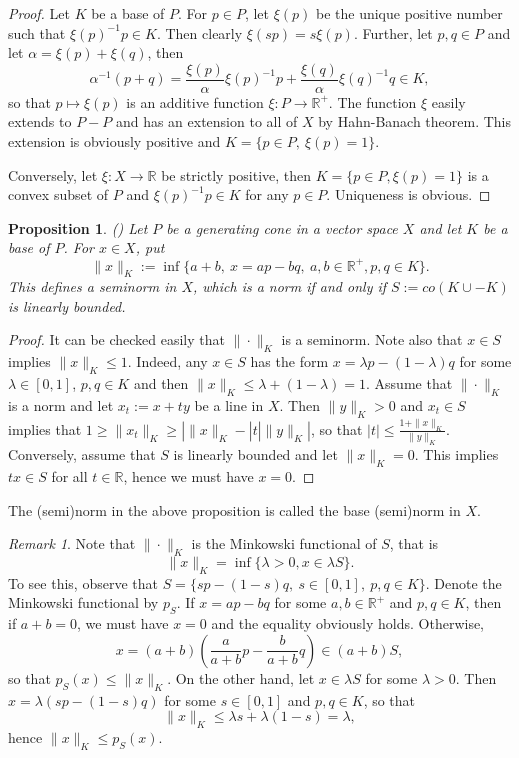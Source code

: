 \documentclass[12pt]{article}
\newtheorem{prop}{Proposition}
\theoremstyle{remark}
\newtheorem{rem}{Remark}
\newcommand{\<}{\langle}
\begin{document}
\begin{proof}  Let $K$ be a base of $P$. For $p\in P$, let $\xi(p)$ be the unique positive number such that 
$\xi(p)^{-1}p\in K$. Then clearly $\xi(sp)=s\xi(p)$. Further, let $p,q\in P$ and let $\alpha=\xi(p)+\xi(q)$, then 
\[
\alpha^{-1}(p+q)=\frac{\xi(p)}{\alpha} \xi(p)^{-1}p+ \frac{\xi(q)}{\alpha} \xi(q)^{-1}q\in K,
\]
so that  $p\mapsto \xi(p)$ is an additive function  $\xi: P\to \mathbb R^+$. The function $\xi$ easily extends to $P-P$ and has an extension to all of $X$ by Hahn-Banach theorem. This extension is obviously positive and $K=\{p\in P,\ \xi(p)=1\}$.  

Conversely, let $\xi:X\to \mathbb R$ be strictly positive, then $K=\{p\in P, \xi(p)=1\}$ is a convex subset of $P$ and $\xi(p)^{-1}p\in K$ for any $p\in P$. Uniqueness is obvious. 



\end{proof}



\begin{prop} (\cite{ellis}) Let $P$ be a generating cone in a vector space $X$ and let $K$ be a base of $P$. For $x\in X$, put 
\[
\|x\|_K:=\inf\{a+b,\ x=a p-b q,\ a,b\in \mathbb R^+, p,q\in K\}.
\]
This defines a seminorm in $X$, which is a norm if and only if $S:=co(K\cup -K)$ is linearly bounded. 

\end{prop}

\begin{proof}
It can be checked easily that $\|\cdot\|_K$ is a seminorm. Note also that $x\in S$ implies $\|x\|_K\le 1$. Indeed, any $x\in S$ has the form $x=\lambda p-(1-\lambda)q$ for some  $\lambda\in [0,1]$, $p,q\in K$ and then  $\|x\|_K\le \lambda+(1-\lambda)=1$.  
Assume that $\|\cdot\|_K$ is a norm and let $x_t:=x+ty$ be a line in $X$. Then $\|y\|_K>0$ and $x_t\in  S$ implies that $1\ge \|x_t\|_K\ge |\|x\|_K-|t|\|y\|_K|$, so that $|t|\le \tfrac{1+\|x\|_K}{\|y\|_K}$. Conversely, assume that $S$ is linearly bounded and let $\|x\|_K=0$. This implies $tx\in S$ for all $t\in \mathbb R$, hence we must have 
$x=0$. 
 

\end{proof}

The (semi)norm in the above proposition  is called  the base (semi)norm in $X$. 

\begin{rem}\label{rem:minkowski}
Note that $\|\cdot\|_K$ is the Minkowski functional of $S$, that is
\[
\|x\|_K= \inf\{\lambda>0, x\in \lambda S\}.
\]
To see this, observe that $S=\{s p-(1-s)q,\ s\in [0,1],\ p,q\in K\}$. Denote the Minkowski functional by $p_S$. If $x=ap-bq$ for some $a,b\in \mathbb R^+$ and $p,q\in K$, then if $a+b=0$, we must have 
$x=0$ and the equality obviously holds. Otherwise, 
\[
x= (a+b)(\frac a{a+b} p-\frac b{a+b} q)\in (a+b) S,
\]
so that $p_S(x)\le \|x\|_K$. On the other hand, let $x\in \lambda S$ for some $\lambda>0$. Then $x=\lambda(sp-(1-s)q)$ for some $s\in [0,1]$ and $p,q\in K$, so that 
\[
\|x\|_K\le \lambda s+\lambda(1-s)=\lambda,
\]
hence $\|x\|_K\le p_S(x)$.   
\end{rem}
\end{document}
